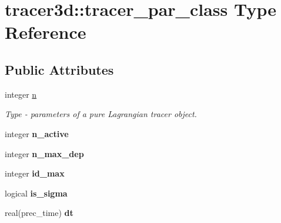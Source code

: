 \hypertarget{structtracer3d_1_1tracer__par__class}{}\section{tracer3d\+:\+:tracer\+\_\+par\+\_\+class Type Reference}
\label{structtracer3d_1_1tracer__par__class}
\subsection*{Public Attributes}
\begin{DoxyCompactItemize}
\item 
\mbox{\label{structtracer3d_1_1tracer__par__class_afee9b223da2104cc94d7925a09ce1b5b}} 
integer \mbox{\hyperlink{structtracer3d_1_1tracer__par__class_afee9b223da2104cc94d7925a09ce1b5b}{n}}
\begin{DoxyCompactList}\small\item\em Type -\/ parameters of a pure Lagrangian tracer object. \end{DoxyCompactList}\item 
\mbox{\label{structtracer3d_1_1tracer__par__class_a595e743676b4b97d7b6895ce1da701c2}} 
integer {\bfseries n\+\_\+active}
\item 
\mbox{\label{structtracer3d_1_1tracer__par__class_a88718350ee32f1a882264dd68ed377a8}} 
integer {\bfseries n\+\_\+max\+\_\+dep}
\item 
\mbox{\label{structtracer3d_1_1tracer__par__class_a249769f71ff720d3ac6d594c7670f507}} 
integer {\bfseries id\+\_\+max}
\item 
\mbox{\label{structtracer3d_1_1tracer__par__class_ab3070eb172aec777973175d521fde0d4}} 
logical {\bfseries is\+\_\+sigma}
\item 
\mbox{\label{structtracer3d_1_1tracer__par__class_a17d4f4f2e5c564cfd71aec5a9c86e9ae}} 
real(prec\+\_\+time) {\bfseries dt}
\item 
\mbox{\label{structtracer3d_1_1tracer__par__class_a03f19bcc6a1d85314b1e79b3339092fa}} 

\end{DoxyCompactItemize}
